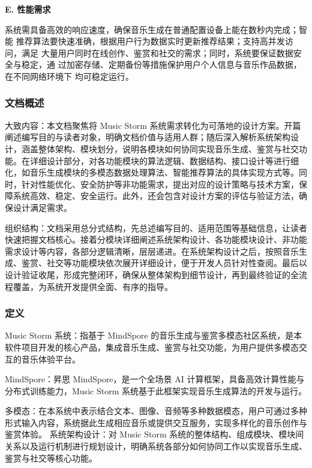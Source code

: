 \documentclass{base}
\begin{document}
\textbf{E. 性能需求​}

系统需具备高效的响应速度，确保音乐生成在普通配置设备上能在数秒内完成；智能	推荐算法要快速准确，根据用户行为数据实时更新推荐结果；支持高并发访问，满足	大量用户同时在线创作、鉴赏和社交的需求；同时，系统要保证数据安全与稳定，通	过加密存储、定期备份等措施保护用户个人信息与音乐作品数据，在不同网络环境下	均可稳定运行。

\subsubsection{文档概述}

大致内容：本文档聚焦将 Music Storm 系统需求转化为可落地的设计方案。开篇阐述编写目的与读者对象，明确文档价值与适用人群；随后深入解析系统架构设计，涵盖整体架构、模块划分，说明各模块如何协同实现音乐生成、鉴赏与社交功能。在详细设计部分，对各功能模块的算法逻辑、数据结构、接口设计等进行细化，如音乐生成模块的多模态数据处理算法、智能推荐算法的具体实现方式等。同时，针对性能优化、安全防护等非功能需求，提出对应的设计策略与技术方案，保障系统高效、稳定、安全运行。此外，还会包含对设计方案的评估与验证方法，确保设计满足需求。​

组织结构：文档采用总分式结构，先总述编写目的、适用范围等基础信息，让读者快速把握文档核心。接着分模块详细阐述系统架构设计、各功能模块设计、非功能需求设计等内容，各部分逻辑清晰，层层递进。在系统架构设计之后，按照音乐生成、鉴赏、社交等功能模块依次展开详细设计，便于开发人员针对性查阅。最后以设计验证收尾，形成完整闭环，确保从整体架构到细节设计，再到最终验证的全流程覆盖，为系统开发提供全面、有序的指导。

\subsubsection{定义}

Music Storm 系统：指基于 MindSpore 的音乐生成与鉴赏多模态社区系统，是本软件项目开发的核心产品，集成音乐生成、鉴赏与社交功能，为用户提供多模态交互的音乐体验平台。​

MindSpore：昇思 MindSpore，是一个全场景 AI 计算框架，具备高效计算性能与分布式训练能力，Music Storm 系统基于此框架实现音乐生成算法的开发与运行。​

多模态：在本系统中表示结合文本、图像、音频等多种数据模态，用户可通过多种形式输入内容，系统据此生成相应音乐或提供交互服务，实现多样化的音乐创作与鉴赏体验。
系统架构设计：对 Music Storm 系统的整体结构、组成模块、模块间关系以及运行机制进行规划设计，明确系统各部分如何协同工作以实现音乐生成、鉴赏与社交等核心功能。​
\end{document}
